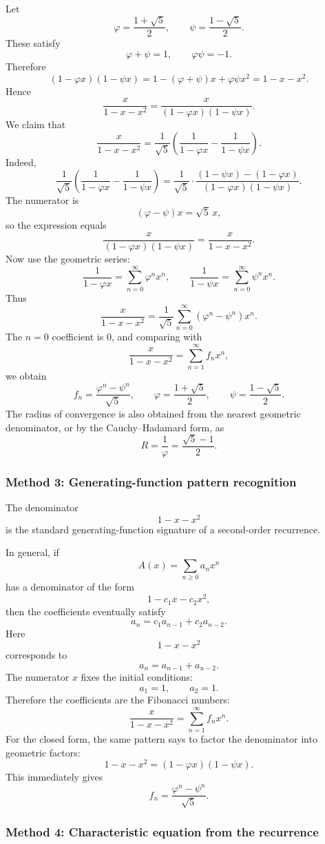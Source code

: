 \documentclass[12pt]{article}
\begin{document}
Let
\[
\varphi=\frac{1+\sqrt5}{2},
\qquad
\psi=\frac{1-\sqrt5}{2}.
\]
These satisfy
\[
\varphi+\psi=1,
\qquad
\varphi\psi=-1.
\]
Therefore
\[
(1-\varphi x)(1-\psi x)
=
1-(\varphi+\psi)x+\varphi\psi x^2
=
1-x-x^2.
\]
Hence
\[
\frac{x}{1-x-x^2}
=
\frac{x}{(1-\varphi x)(1-\psi x)}.
\]
We claim that
\[
\frac{x}{1-x-x^2}
=
\frac{1}{\sqrt5}
\left(
\frac{1}{1-\varphi x}
-
\frac{1}{1-\psi x}
\right).
\]
Indeed,
\[
\frac{1}{\sqrt5}
\left(
\frac{1}{1-\varphi x}
-
\frac{1}{1-\psi x}
\right)
=
\frac{1}{\sqrt5}
\cdot
\frac{(1-\psi x)-(1-\varphi x)}
{(1-\varphi x)(1-\psi x)}.
\]
The numerator is
\[
(\varphi-\psi)x=\sqrt5\,x,
\]
so the expression equals
\[
\frac{x}{(1-\varphi x)(1-\psi x)}
=
\frac{x}{1-x-x^2}.
\]
Now use the geometric series:
\[
\frac{1}{1-\varphi x}
=
\sum_{n=0}^{\infty}\varphi^nx^n,
\qquad
\frac{1}{1-\psi x}
=
\sum_{n=0}^{\infty}\psi^nx^n.
\]
Thus
\[
\frac{x}{1-x-x^2}
=
\frac1{\sqrt5}
\sum_{n=0}^{\infty}(\varphi^n-\psi^n)x^n.
\]
The \(n=0\) coefficient is \(0\), and comparing with
\[
\frac{x}{1-x-x^2}=\sum_{n=1}^{\infty}f_nx^n,
\]
we obtain
\[
\boxed{
f_n=\frac{\varphi^n-\psi^n}{\sqrt5},
\qquad
\varphi=\frac{1+\sqrt5}{2},
\qquad
\psi=\frac{1-\sqrt5}{2}.
}
\]
The radius of convergence is also obtained from the nearest geometric denominator, or
by the Cauchy--Hadamard form, as
\[
R=\frac1{\varphi}=\frac{\sqrt5-1}{2}.
\]

\newpage
\subsubsection{Method 3: Generating-function pattern recognition}

The denominator
\[
1-x-x^2
\]
is the standard generating-function signature of a second-order recurrence.

In general, if
\[
A(x)=\sum_{n\ge0}a_nx^n
\]
has a denominator of the form
\[
1-c_1x-c_2x^2,
\]
then the coefficients eventually satisfy
\[
a_n=c_1a_{n-1}+c_2a_{n-2}.
\]
Here
\[
1-x-x^2
\]
corresponds to
\[
a_n=a_{n-1}+a_{n-2}.
\]
The numerator \(x\) fixes the initial conditions:
\[
a_1=1,\qquad a_2=1.
\]
Therefore the coefficients are the Fibonacci numbers:
\[
\boxed{
\frac{x}{1-x-x^2}
=
\sum_{n=1}^{\infty}f_nx^n.
}
\]
For the closed form, the same pattern says to factor the denominator into geometric
factors:
\[
1-x-x^2=(1-\varphi x)(1-\psi x).
\]
This immediately gives
\[
\boxed{
f_n=\frac{\varphi^n-\psi^n}{\sqrt5}.
}
\]

\newpage
\subsubsection{Method 4: Characteristic equation from the recurrence}
\end{document}
